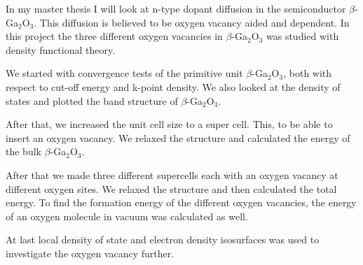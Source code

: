 
In my master thesis I will look at n-type dopant diffusion in the semiconductor $\beta$-Ga$_2$O$_3$. This diffusion is believed to be oxygen vacancy aided and dependent. In this project the three different oxygen vacancies in $\beta$-Ga$_2$O$_3$ was studied with density functional theory.

We started with convergence tests of the primitive unit $\beta$-Ga$_2$O$_3$, both with respect to cut-off energy and k-point density. We also looked at the density of states and plotted the band structure of $\beta$-Ga$_2$O$_3$.

After that, we increased the unit cell size to a super cell. This, to be able to insert an oxygen vacancy. We relaxed the structure and calculated the energy of the bulk $\beta$-Ga$_2$O$_3$.

After that we made three different supercells each with an oxygen vacancy at different oxygen sites. We relaxed the structure and then calculated the total energy. To find the formation energy of the different oxygen vacancies, the energy of an oxygen molecule in vacuum was calculated as well. 

At last local density of state and electron density isosurfaces was used to investigate the oxygen vacancy further. 
